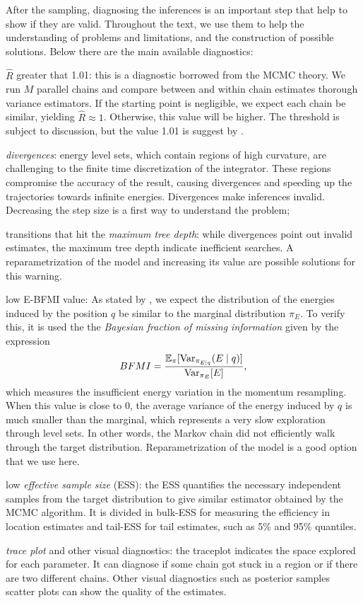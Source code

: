 After the sampling, diagnosing the inferences is an important step that help to
show if they are valid. Throughout the text, we use them to help the
understanding of problems and limitations, and the construction of possible
solutions. Below there are the main available diagnostics:

\begin{alineas}
  \item $\hat{R}$ greater that 1.01: this is a diagnostic borrowed from the
  MCMC theory. We run $M$ parallel chains and compare between and within chain
  estimates thorough variance estimators. If the starting point is
  negligible, we expect each chain be similar, yielding $\hat{R} \approx 1$.
  Otherwise, this value will be higher. The threshold is subject to
  discussion, but the value 1.01 is suggest by \textcite[p. 4]{vehtari2019rank}.
  \item {\em divergences}: energy level sets, which contain regions of high
  curvature, are challenging to the finite time discretization of the
  integrator. These regions compromise the accuracy of the result, causing
  divergences and speeding up the trajectories towards infinite energies.
  Divergences make inferences invalid. Decreasing the step size is a first way to understand the problem;
  \item transitions that hit the {\em maximum tree depth}: while divergences point
  out invalid estimates, the maximum tree depth indicate inefficient searches.
  A reparametrization of the model and increasing its value 
  are possible solutions for this warning. 
  \item low E-BFMI value: As stated by \textcite[p.
  6]{betancourt2016diagnosing}, we expect the distribution of the energies
  induced by the position $q$ be similar to the marginal distribution $\pi_E$.
  To verify this, it is used the the {\em Bayesian fraction of missing information} given by the expression 
  $$
  BFMI = \frac{\mathbb{E}_{\pi}[\operatorname{Var}_{\pi_{E \mid q}}(E \mid q)]}{\operatorname{Var}_{\pi_E}[E]},
  $$
  which measures the insufficient energy variation in the momentum resampling.
  When this value is close to $0$, the average variance of the energy induced
  by $q$ is much smaller than the marginal, which represents a very slow
  exploration through level sets. In other words, the Markov chain did not
  efficiently walk through the target distribution. Reparametrization of the
  model is a good option that we use here. 
  \item low {\em effective sample size} (ESS): the ESS quantifies the
  necessary independent samples from the target distribution to give similar
  estimator obtained by the MCMC algorithm. It is divided in bulk-ESS for
  measuring the efficiency in location estimates and tail-ESS for tail
  estimates, such as 5\% and 95\% quantiles. 
  \item {\em trace plot} and other visual diagnostics: the traceplot indicates
  the space explored for each parameter. It can diagnose if some chain got
  stuck in a region or if there are two different chains. Other visual
  diagnostics such as posterior samples scatter plots can show the quality of
  the estimates.
\end{alineas}

